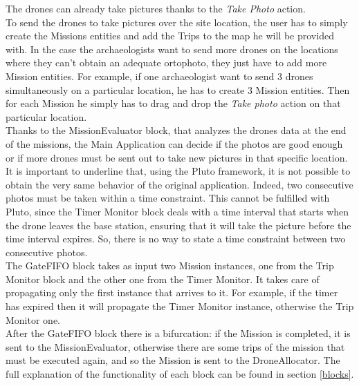 The drones can already take pictures thanks to the \textit{Take Photo} action.
\\

To send the drones to take pictures over the site location, the user has to simply create the Missions entities and add the Trips to the map he will be provided with.
In the case the archaeologists want to send more drones on the locations where they can't obtain an adequate ortophoto, they just have to add more Mission entities.
For example, if one archaeologist want to send 3 drones simultaneously on a particular location, he has to create 3 Mission entities.
Then for each Mission he simply has to drag and drop the \textit{Take photo} action on that particular location.
\\

Thanks to the MissionEvaluator block, that analyzes the drones data at the end of the missions, the Main Application can decide if the photos are good enough or if more drones must be sent out to take new pictures in that specific location.
\\

It is important to underline that, using the Pluto framework, it is not possible to obtain the very same behavior of the original application.
Indeed, two consecutive photos must be taken within a time constraint.
This cannot be fulfilled with Pluto, since the Timer Monitor block deals with a time interval that starts when the drone leaves the base station, ensuring that it will take the picture before the time interval expires.
So, there is no way to state a time constraint between two consecutive photos.
\\

The GateFIFO block takes as input two Mission instances, one from the Trip Monitor block and the other one from the Timer Monitor.
It takes care of propagating only the first instance that arrives to it.
For example, if the timer has expired then it will propagate the Timer Monitor instance, otherwise the Trip Monitor one.
\\

After the GateFIFO block there is a bifurcation:
if the Mission is completed, it is sent to the MissionEvaluator, otherwise there are some trips of the mission that must be executed again, and so the Mission is sent to the DroneAllocator.
The full explanation of the functionality of each block can be found in section \ref{blocks}.



